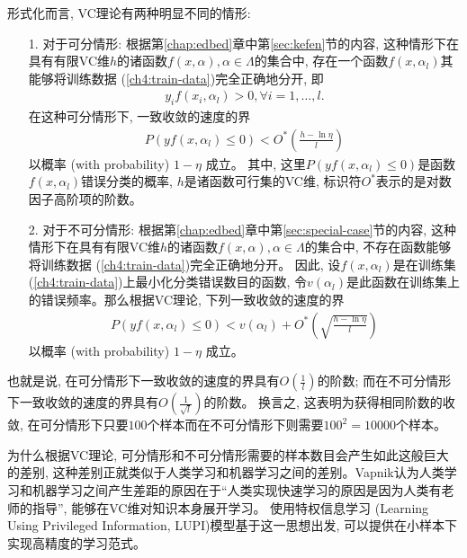 形式化而言, VC理论有两种明显不同的情形:
\begin{enumerate}
\item[1.] \textsf{对于可分情形:} 根据第\ref{chap:edbed}章中第\ref{sec:kefen}节的内容, 这种情形下在具有有限VC维$h$的诸函数$f(x,\alpha), \alpha \in \Lambda$的集合中, 存在一个函数$f(x,\alpha_{l})$其能够将训练数据 (\ref{ch4:train-data})完全正确地分开, 即
\begin{align}
y_{i}f(x_{i}, \alpha_{l}) > 0, \forall i = 1, \ldots, l.
\end{align}
在这种可分情形下, 一致收敛的速度的界
\begin{align}
P(yf(x, \alpha_{l}) \leq 0) < O^{*}\left(\frac{h - \ln \eta}{l}\right)
\end{align}
以概率 (with probability) $1-\eta$ 成立。 其中, 这里$P(yf(x, \alpha_{l}) \leq 0)$是函数$f(x, \alpha_{l})$错误分类的概率, $h$是诸函数可行集的VC维, 标识符$O^{*}$表示的是对数因子高阶项的阶数。
\item[2.] \textsf{对于不可分情形:} 根据第\ref{chap:edbed}章中第\ref{sec:special-case}节的内容, 这种情形下在具有有限VC维$h$的诸函数$f(x,\alpha), \alpha \in \Lambda$的集合中, 不存在函数能够将训练数据 (\ref{ch4:train-data})完全正确地分开。 因此, 设$f(x, \alpha_{l})$是在训练集(\ref{ch4:train-data})上最小化分类错误数目的函数, 令$v(\alpha_{l})$是此函数在训练集上的错误频率。那么根据VC理论, 下列一致收敛的速度的界
\begin{align}
P(yf(x, \alpha_{l}) \leq 0) < v(\alpha_{l}) + O^{*}\left(\sqrt{\frac{h - \ln \eta}{l}}\right)
\end{align}
以概率 (with probability) $1-\eta$ 成立。
\end{enumerate}

也就是说, 在可分情形下一致收敛的速度的界具有$O(\frac{1}{l})$的阶数; 而在不可分情形下一致收敛的速度的界具有$O(\frac{1}{\sqrt{l}})$的阶数。 换言之, 这表明为获得相同阶数的收敛, 在可分情形下只要$100$个样本而在不可分情形下则需要$100^{2} = 10000$个样本。 

为什么根据VC理论, 可分情形和不可分情形需要的样本数目会产生如此这般巨大的差别, 这种差别正就类似于人类学习和机器学习之间的差别。Vapnik认为人类学习和机器学习之间产生差距的原因在于“人类实现快速学习的原因是因为人类有老师的指导”\citep{vapnikinterview2014,vapniktalk2022,vapniktalk2022-02}, 能够在VC维对知识本身展开学习\citep{Vapnik-rethinking-2018,vapnik2020,Vapnik2021,2019Reconciling}。 使用特权信息学习 (Learning Using Privileged Information, LUPI)\citep{Vapnik2009,vapnik2015}模型基于这一思想出发, 可以提供在小样本下实现高精度的学习范式。

